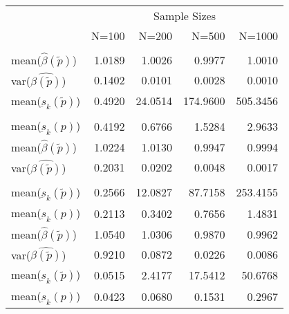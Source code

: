 
\begin{tabular}{lrrrr}
\toprule
\multicolumn{1}{c}{ } & \multicolumn{4}{c}{Sample Sizes} \\
\cmidrule(l{3pt}r{3pt}){2-5}
  & N=100 & N=200 & N=500 & N=1000\\
\midrule
\addlinespace[0.3em]
\multicolumn{5}{l}{\textbf{$ \rho = 0 $  }}\\
\hspace{1em}mean($\hat{\beta}(\tilde{p})$) & 1.0189 & 1.0026 & 0.9977 & 1.0010\\
\hspace{1em}var($\hat{\beta(\tilde{p})}$) & 0.1402 & 0.0101 & 0.0028 & 0.0010\\
\hspace{1em}mean($\underbar{s}_k(\tilde{p})$) & 0.4920 & 24.0514 & 174.9600 & 505.3456\\
\addlinespace[0.3em]
\multicolumn{5}{l}{\textbf{$ \rho = 0.5 $}}\\
\hspace{1em}mean($\underbar{s}_k(p)$) & 0.4192 & 0.6766 & 1.5284 & 2.9633\\
\hspace{1em}mean($\hat{\beta}(\tilde{p})$) & 1.0224 & 1.0130 & 0.9947 & 0.9994\\
\hspace{1em}var($\hat{\beta(\tilde{p})}$) & 0.2031 & 0.0202 & 0.0048 & 0.0017\\
\addlinespace[0.3em]
\multicolumn{5}{l}{\textbf{$ \rho = 0.9 $}}\\
\hspace{1em}mean($\underbar{s}_k(\tilde{p})$) & 0.2566 & 12.0827 & 87.7158 & 253.4155\\
\hspace{1em}mean($\underbar{s}_k(p)$) & 0.2113 & 0.3402 & 0.7656 & 1.4831\\
\hspace{1em}mean($\hat{\beta}(\tilde{p})$) & 1.0540 & 1.0306 & 0.9870 & 0.9962\\
var($\hat{\beta(\tilde{p})}$) & 0.9210 & 0.0872 & 0.0226 & 0.0086\\
mean($\underbar{s}_k(\tilde{p})$) & 0.0515 & 2.4177 & 17.5412 & 50.6768\\
mean($\underbar{s}_k(p)$) & 0.0423 & 0.0680 & 0.1531 & 0.2967\\
\bottomrule
\end{tabular}
